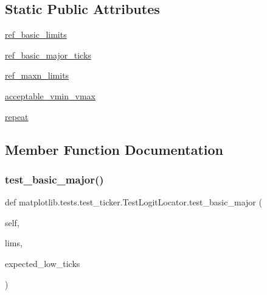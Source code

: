 \subsection*{Static Public Attributes}
\begin{DoxyCompactItemize}
\item 
\hyperlink{classmatplotlib_1_1tests_1_1test__ticker_1_1TestLogitLocator_a5024fcbbcf3153c3368aa1b06f3e7f7e}{ref\+\_\+basic\+\_\+limits}
\item 
\hyperlink{classmatplotlib_1_1tests_1_1test__ticker_1_1TestLogitLocator_abf03e0382041a6677a8bac64ad2e4e84}{ref\+\_\+basic\+\_\+major\+\_\+ticks}
\item 
\hyperlink{classmatplotlib_1_1tests_1_1test__ticker_1_1TestLogitLocator_af5f6478eb8a1e992f59f3e13ff336325}{ref\+\_\+maxn\+\_\+limits}
\item 
\hyperlink{classmatplotlib_1_1tests_1_1test__ticker_1_1TestLogitLocator_a52350b19870d8990fa3db293a629851e}{acceptable\+\_\+vmin\+\_\+vmax}
\item 
\hyperlink{classmatplotlib_1_1tests_1_1test__ticker_1_1TestLogitLocator_a7e17d1d71b09c8d9a1c2d779eeef7520}{repeat}
\end{DoxyCompactItemize}


\subsection{Member Function Documentation}
\mbox{\label{classmatplotlib_1_1tests_1_1test__ticker_1_1TestLogitLocator_a012690a1ca244cef6e2241152279dd06}} 
\subsubsection{\texorpdfstring{test\+\_\+basic\+\_\+major()}{test\_basic\_major()}}
{\footnotesize\ttfamily def matplotlib.\+tests.\+test\+\_\+ticker.\+Test\+Logit\+Locator.\+test\+\_\+basic\+\_\+major (\begin{DoxyParamCaption}\item[{}]{self,  }\item[{}]{lims,  }\item[{}]{expected\+\_\+low\+\_\+ticks }\end{DoxyParamCaption})}

